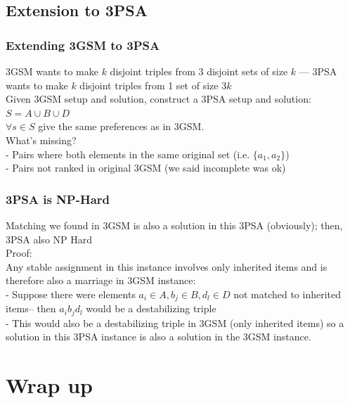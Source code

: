 \documentclass[mathserif,serif]{beamer}
\begin{document}


\subsection{Extension to 3PSA}

\begin{frame}
	\frametitle{Extending 3GSM to 3PSA}
	
	3GSM wants to make $k$ disjoint triples from 3 disjoint sets of size $k$ --- 3PSA wants to make $k$ disjoint triples from 1 set of size $3k$\\
	
	Given 3GSM setup and solution, construct a 3PSA setup and solution: \\
		$S = A \cup B \cup D$\\
		$\forall s \in S$ give the same preferences as in 3GSM.\\
		
		What's missing?\\
			- Pairs where both elements in the same original set (i.e. $\{ a_1, a_2 \}$) \\
			- Pairs not ranked in original 3GSM (we said incomplete was ok)\\
\end{frame}

\begin{frame}
	\frametitle{3PSA is NP-Hard} %
		Matching we found in 3GSM is also a solution in this 3PSA (obviously); then, 3PSA also NP Hard\\
		
		Proof:\\
			Any stable assignment in this instance involves only inherited items and is
	therefore also a marriage in 3GSM instance: \\
			- Suppose there were elements $a_i \in A, b_j \in B, d_l \in D$ not matched to inherited items-- then $a_i b_j d_l$ would be a destabilizing triple\\ %
			- This would also be a destabilizing triple in 3GSM (only inherited items) so a solution in this 3PSA instance is also a solution in the 3GSM instance. \\
	
\end{frame}

\section{Wrap up}
\end{document}
